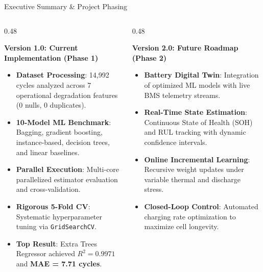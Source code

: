 \documentclass[aspectratio=169, 10pt]{beamer}
\begin{document}
\begin{frame}{Executive Summary \& Project Phasing}
\begin{columns}[T]
  \begin{column}{0.48\textwidth}
    \begin{block}{\textbf{Version 1.0: Current Implementation (Phase 1)}}
      \begin{itemize}\small
        \item \textbf{Dataset Processing}: 14,992 cycles analyzed across 7 operational degradation features (0 nulls, 0 duplicates).
        \item \textbf{10-Model ML Benchmark}: Bagging, gradient boosting, instance-based, decision trees, and linear baselines.
        \item \textbf{Parallel Execution}: Multi-core parallelized estimator evaluation and cross-validation.
        \item \textbf{Rigorous 5-Fold CV}: Systematic hyperparameter tuning via \texttt{GridSearchCV}.
        \item \textbf{Top Result}: Extra Trees Regressor achieved \textbf{$R^2 = 0.9971$} and \textbf{MAE = 7.71 cycles}.
      \end{itemize}
    \end{block}
  \end{column}
  
  \begin{column}{0.48\textwidth}
    \begin{block}{\textbf{Version 2.0: Future Roadmap (Phase 2)}}
      \begin{itemize}\small
        \item \textbf{Battery Digital Twin}: Integration of optimized ML models with live BMS telemetry streams.
        \item \textbf{Real-Time State Estimation}: Continuous State of Health (SOH) and RUL tracking with dynamic confidence intervals.
        \item \textbf{Online Incremental Learning}: Recursive weight updates under variable thermal and discharge stress.
        \item \textbf{Closed-Loop Control}: Automated charging rate optimization to maximize cell longevity.
      \end{itemize}
    \end{block}
  \end{column}
\end{columns}
\end{frame}
\end{document}
